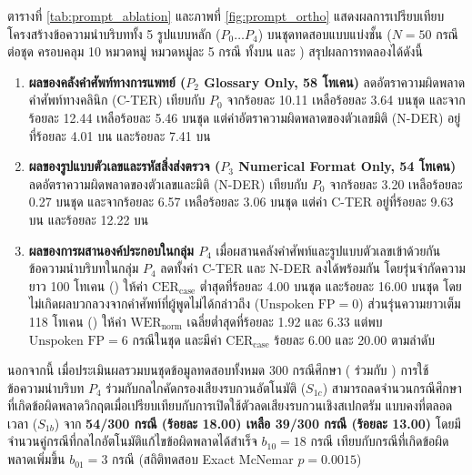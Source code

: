 ตารางที่ \ref{tab:prompt_ablation} และภาพที่ \ref{fig:prompt_ortho} แสดงผลการเปรียบเทียบโครงสร้างข้อความนำบริบททั้ง 5 รูปแบบหลัก ($P_0 \dots P_4$) บนชุดทดสอบแบบแบ่งชั้น ($N = 50$ กรณีต่อชุด ครอบคลุม 10 หมวดหมู่ หมวดหมู่ละ 5 กรณี ทั้งบน  และ ) สรุปผลการทดลองได้ดังนี้
\begin{enumerate}[label=(\arabic*), leftmargin=*, align=left]
    \item \textbf{ผลของคลังคำศัพท์ทางการแพทย์ ($P_2$ Glossary Only, 58 โทเคน)} ลดอัตราความผิดพลาดคำศัพท์ทางคลินิก (C-TER) เทียบกับ $P_0$ จากร้อยละ 10.11 เหลือร้อยละ 3.64 บนชุด  และจากร้อยละ 12.44 เหลือร้อยละ 5.46 บนชุด  แต่ค่าอัตราความผิดพลาดของตัวเลขมิติ (N-DER) อยู่ที่ร้อยละ 4.01 บน  และร้อยละ 7.41 บน 
    \item \textbf{ผลของรูปแบบตัวเลขและรหัสสิ่งส่งตรวจ ($P_3$ Numerical Format Only, 54 โทเคน)} ลดอัตราความผิดพลาดของตัวเลขและมิติ (N-DER) เทียบกับ $P_0$ จากร้อยละ 3.20 เหลือร้อยละ 0.27 บนชุด  และจากร้อยละ 6.57 เหลือร้อยละ 3.06 บนชุด  แต่ค่า C-TER อยู่ที่ร้อยละ 9.63 บน  และร้อยละ 12.22 บน 
    \item \textbf{ผลของการผสานองค์ประกอบในกลุ่ม $P_4$} เมื่อผสานคลังคำศัพท์และรูปแบบตัวเลขเข้าด้วยกัน ข้อความนำบริบทในกลุ่ม $P_4$ ลดทั้งค่า C-TER และ N-DER ลงได้พร้อมกัน โดยรุ่นจำกัดความยาว 100 โทเคน () ให้ค่า $\mathrm{CER}_{\mathrm{case}}$ ต่ำสุดที่ร้อยละ 4.00 บนชุด  และร้อยละ 16.00 บนชุด  โดยไม่เกิดผลบวกลวงจากคำศัพท์ที่ผู้พูดไม่ได้กล่าวถึง ($\text{Unspoken FP} = 0$) ส่วนรุ่นความยาวเต็ม 118 โทเคน () ให้ค่า $\mathrm{WER}_{\mathrm{norm}}$ เฉลี่ยต่ำสุดที่ร้อยละ 1.92 และ 6.33 แต่พบ $\text{Unspoken FP} = 6$ กรณีในชุด  และมีค่า $\mathrm{CER}_{\mathrm{case}}$ ร้อยละ 6.00 และ 20.00 ตามลำดับ
\end{enumerate}

นอกจากนี้ เมื่อประเมินผลรวมบนชุดข้อมูลทดสอบทั้งหมด 300 กรณีศึกษา ( ร่วมกับ ) การใช้ข้อความนำบริบท $P_4$ ร่วมกับกลไกคัดกรองเสียงรบกวนอัตโนมัติ \textbf{} ($S_{1c}$) สามารถลดจำนวนกรณีศึกษาที่เกิดข้อผิดพลาดวิกฤตเมื่อเปรียบเทียบกับการเปิดใช้ตัวลดเสียงรบกวนเชิงสเปกตรัม  แบบคงที่ตลอดเวลา ($S_{1b}$) จาก \textbf{54/300 กรณี (ร้อยละ 18.00) เหลือ 39/300 กรณี (ร้อยละ 13.00)} โดยมีจำนวนคู่กรณีที่กลไกอัตโนมัติแก้ไขข้อผิดพลาดได้สำเร็จ $b_{10} = 18$ กรณี เทียบกับกรณีที่เกิดข้อผิดพลาดเพิ่มขึ้น $b_{01} = 3$ กรณี (สถิติทดสอบ Exact McNemar $p = 0.0015$)


